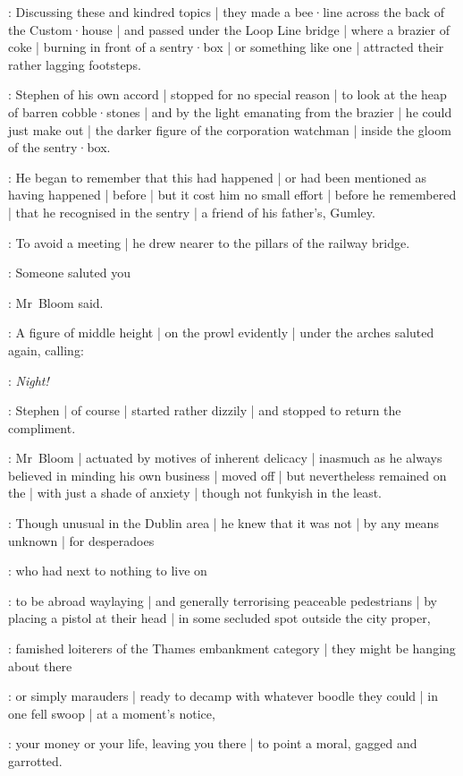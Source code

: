 :
Discussing these and kindred topics |
they made a bee·line across the back of the Custom·house |
and passed under the Loop Line bridge |
where a brazier of coke |
burning in front of a sentry·box |
or something like one |
attracted their rather lagging footsteps.

:
Stephen of his own accord |
stopped for no special reason |
to look at the heap of barren cobble·stones |
and by the light emanating from the brazier |
he could just make out |
the darker figure of the corporation watchman |
inside the gloom of the sentry·box.

:
He began to remember that this had happened |
or had been mentioned as having happened |
before |
but it cost him no small effort |
before he remembered |
that he recognised in the sentry |
a  friend of his father's,
Gumley.

:
To avoid a meeting |
he drew nearer to the pillars of the railway bridge.%

\Bloom:
Someone saluted you

:
Mr~Bloom said.

:
A figure of middle height |
on the prowl evidently |
under the arches saluted again,
calling:

\LordJohnCorley:
\emph{Night!}

:
Stephen |
of course |
started rather dizzily |
and stopped to return the compliment.

:
Mr~Bloom |
actuated by motives of inherent delicacy |
inasmuch as he always believed in minding his own business |
moved off |
but nevertheless remained on the  |
with just a shade of anxiety |
though not funkyish in the least.

:
Though unusual in the Dublin area |
he knew that it was not |
by any means unknown |
for desperadoes%

:
who had next to nothing to live on

:
to be abroad waylaying |
and generally terrorising peaceable pedestrians |
by placing a pistol at their head |
in some secluded spot outside the city proper,

:
famished loiterers of the Thames embankment category |
they might be hanging about there

:
or simply marauders |
ready to decamp with whatever boodle they could |
in one fell swoop |
at a moment's notice,

:
your money or your life,
leaving you there |
to point a moral,
gagged and garrotted.

